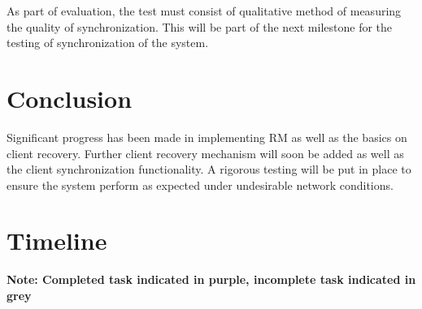 \documentclass[12pt]{article}
\begin{document}
As part of evaluation, the test must consist of qualitative method of measuring the quality of synchronization. This will be part of the next milestone for the testing of synchronization of the system.


\section{Conclusion}
Significant progress has been made in implementing RM as well as the basics on client recovery. Further client recovery mechanism will soon be added as well as the client synchronization functionality. A rigorous testing will be put in place to ensure the system perform as expected under undesirable network conditions. 

\pagebreak
\section{Timeline}\label{Timeline}

\textbf{Note: Completed task indicated in purple, incomplete task indicated in grey}
\end{document}
